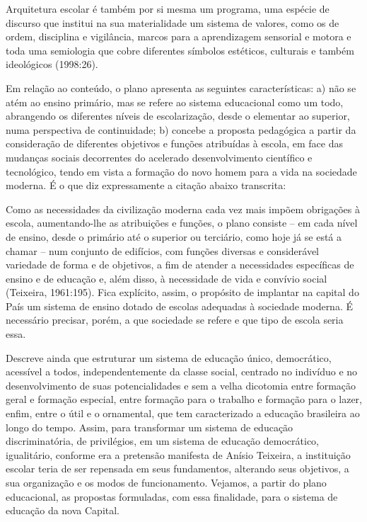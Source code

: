 \begin{citacao}
    Arquitetura escolar é também por si mesma um programa, uma espécie de
    discurso que institui na sua materialidade um sistema de valores, como os de
    ordem, disciplina e vigilância, marcos para a aprendizagem sensorial e
    motora e toda uma semiologia que cobre diferentes símbolos estéticos,
    culturais e também ideológicos (1998:26).
\end{citacao}

Em relação ao conteúdo, o plano apresenta as seguintes características: a) não se
atém ao ensino primário, mas se refere ao sistema educacional como um todo,
abrangendo os diferentes níveis de escolarização, desde o elementar ao superior, numa
perspectiva de continuidade; b) concebe a proposta pedagógica a partir da consideração
de diferentes objetivos e funções atribuídas à escola, em face das mudanças sociais
decorrentes do acelerado desenvolvimento científico e tecnológico, tendo em vista a
formação do novo homem para a vida na sociedade moderna.
É o que diz expressamente a citação abaixo transcrita:
\begin{citacao}
    Como as necessidades da civilização moderna cada vez mais impõem
    obrigações à escola, aumentando-lhe as atribuições e funções, o plano
    consiste – em cada nível de ensino, desde o primário até o superior ou
    terciário, como hoje já se está a chamar – num conjunto de edifícios, com
    funções diversas e considerável variedade de forma e de objetivos, a fim de
    atender a necessidades específicas de ensino e de educação e, além disso, à
    necessidade de vida e convívio social (Teixeira, 1961:195).
    Fica explícito, assim, o propósito de implantar na capital do País um sistema de
    ensino dotado de escolas adequadas à sociedade moderna. É necessário precisar, porém,
    a que sociedade se refere e que tipo de escola seria essa.
\end{citacao}

Descreve  ainda que estruturar um sistema de educação único, democrático,
acessível a todos, independentemente da classe social, centrado no indivíduo e no
desenvolvimento de suas potencialidades e sem a velha dicotomia entre formação geral
e formação especial, entre formação para o trabalho e formação para o lazer, enfim,
entre o útil e o ornamental, que tem caracterizado a educação brasileira ao longo do
tempo. Assim, para transformar um sistema de educação discriminatória, de privilégios,
em um sistema de educação democrático, igualitário, conforme era a pretensão
manifesta de Anísio Teixeira, a instituição escolar teria de ser repensada em seus
fundamentos, alterando seus objetivos, a sua organização e os modos de funcionamento.
Vejamos, a partir do plano educacional, as propostas formuladas, com essa finalidade,
para o sistema de educação da nova Capital.

